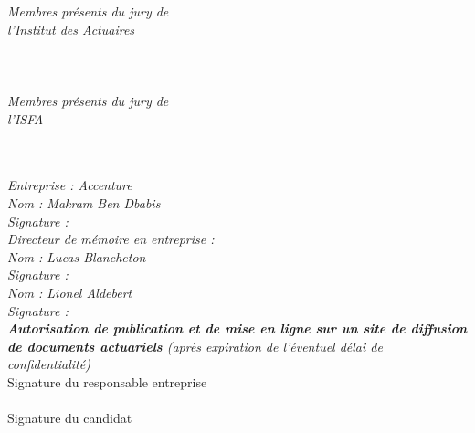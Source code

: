 \begin{titlepage}
{\noindent %
\begin{minipage}[t]{0.5\textwidth}
    \textit{Membres présents du jury de \\ l'Institut des Actuaires} \\[1.2cm]
    \fillin{6cm} \\[0.8cm]
    \fillin{6cm} \\[0.8cm]
    \fillin{6cm} \\[0.8cm]
    \textit{Membres présents du jury de \\ l'ISFA} \\[1.2cm]
    \fillin{6cm} \\[0.8cm]
    \fillin{6cm} \\[0.8cm]
    \fillin{6cm}
\end{minipage}%
\begin{minipage}[t]{0.5\textwidth}
    \textit{Entreprise : Accenture} \\
    \textit{Nom : Makram Ben Dbabis} \\[0.3cm]
    \textit{Signature :} \\[0.5cm]
    \textit{Directeur de mémoire en entreprise :} \\
    \textit{Nom : Lucas Blancheton}  \\[0.3cm]
    \textit{Signature :} \\[0.5cm]
    \textit{Nom : Lionel Aldebert} \\[0.3cm]
    \textit{Signature :} \\[0.5cm]
    \textit{\textbf{Autorisation de publication et de mise en ligne sur un site de diffusion de documents actuariels} (après expiration de l'éventuel délai de confidentialité)} \\[0.2cm]
    Signature du responsable entreprise \\
    \framebox[7cm]{\rule{0mm}{1.5cm}} \\[0.3cm]
    Signature du candidat \\
    \framebox[7cm]{\rule{0mm}{1.5cm}}
\end{minipage}
}
\end{titlepage}